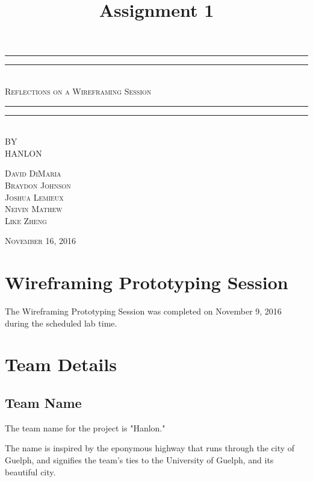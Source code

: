 \documentclass[12pt,letterpaper]{article}
\title{Assignment 1}
\begin{document}
\begin{titlepage}
    \centering
    \vspace*{\baselineskip}
    \rule{\textwidth}{1.6pt}\vspace*{-\baselineskip}\vspace*{2pt}
    \rule{\textwidth}{0.4pt}\\[1.5\baselineskip]
    {\LARGE \textsc{Reflections on a Wireframing Session}}\\[\baselineskip]
	\rule{\textwidth}{0.4pt}\vspace*{-\baselineskip}\vspace{4pt}    
    \rule{\textwidth}{2pt}\\[2\baselineskip]
   
    \vspace*{5\baselineskip}
    \textsc{BY}\\[0.25\baselineskip]
    {\LARGE HANLON} \\
    
    \vspace*{\baselineskip}
    {\textsc{David DiMaria \\ Braydon Johnson \\ Joshua Lemieux \\ Neivin Mathew \\ Like Zheng} \par}
    \vfill
    {\scshape November 16, 2016} \\
  \end{titlepage}
  
  
\tableofcontents
\lhead{} %
\clearpage
{} %
    
\clearpage
\section{Wireframing Prototyping Session}
The Wireframing Prototyping Session was completed on November 9, 2016 during the scheduled lab time.
\section{Team Details}
\subsection{Team Name}
The team name for the project is "Hanlon."\par
The name is inspired by the eponymous highway that runs through the city of Guelph, and signifies the team's ties to the University of Guelph, and its beautiful city.\\
\end{document}
